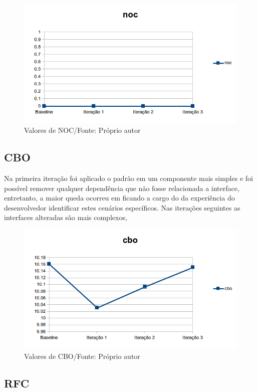 \begin{figure}[h]
	\centering
	\includegraphics{img/noc.png}
	\caption{Valores de NOC/Fonte: Próprio autor}
	\label{fig:noc}
\end{figure}

\subsection{CBO}

Na primeira iteração foi aplicado o padrão em um componente mais simples e foi
possível remover qualquer dependência que não fosse relacionada a interface,
entretanto, a maior queda ocorreu em  ficando a cargo do da experiência do
desenvolvedor identificar estes cenários específicos. Nas iterações seguintes as
interfaces alteradas são mais complexos,


\begin{figure}[h]
	\centering
	\includegraphics{img/cbo.png}
	\caption{Valores de CBO/Fonte: Próprio autor}
	\label{fig:cbo}
\end{figure}


\subsection{RFC}

